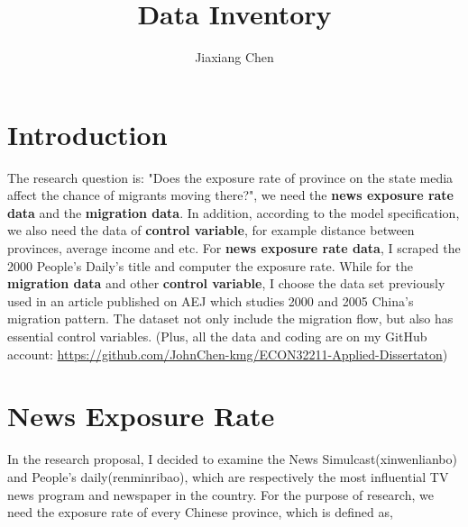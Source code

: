 \documentclass{article}
\title{\textbf{Data Inventory}}
\author{Jiaxiang Chen}
\date{}
\begin{document}
\maketitle
\linespread{1.2}


\section{Introduction}
The research question is: "Does the exposure rate of province on the state media affect the chance of migrants moving there?", we need the \textbf{news exposure rate data} and the \textbf{migration data}. In addition, according to the model specification,  we also need the data of \textbf{control variable}, for example distance between provinces, average income and etc. For \textbf{news exposure rate data}, I scraped the 2000 People's Daily's title and computer the exposure rate. While for the \textbf{migration data} and other \textbf{control variable}, I choose the data set previously used in an article published on AEJ which studies 2000 and 2005 China's migration pattern. The dataset not only include the migration flow, but also has essential control variables.  (Plus, all the data and coding are on my GitHub account: \url{https://github.com/JohnChen-kmg/ECON32211-Applied-Dissertaton})


\section{News Exposure Rate}
In the research proposal, I decided to examine the News Simulcast(xinwenlianbo) and People's daily(renminribao), which are respectively the most influential TV news program and newspaper in the country. For the purpose of research, we need the exposure rate of every Chinese province, which is defined as,
\end{document}
